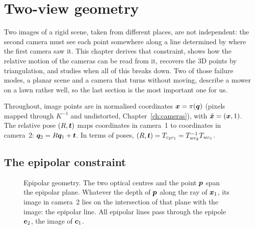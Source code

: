 \chapter{Two-view geometry}
\label{ch:twoview}

Two images of a rigid scene, taken from different places, are not
independent: the second camera must see each point somewhere along a
line determined by where the first camera saw it. This chapter derives
that constraint, shows how the relative motion of the cameras can be
read from it, recovers the 3D points by triangulation, and studies when
all of this breaks down. Two of those failure modes, a planar scene and
a camera that turns without moving, describe a mower on a lawn rather
well, so the last section is the most important one for us.

Throughout, image points are in normalised coordinates
$\bm{x}=\pi(\bm{q})$ (pixels mapped through $K^{-1}$ and
undistorted, Chapter~\ref{ch:cameras}), with $\tilde{\bm{x}}=
(\bm{x},1)$. The relative pose $(R,\bm{t})$ maps coordinates in
camera~1 to coordinates in camera~2: $\bm{q}_2=R\bm{q}_1+\bm{t}$.
In terms of poses, $(R,\bm{t})=T_{c_2c_1}=T_{wc_2}^{-1}T_{wc_1}$.

\section{The epipolar constraint}

\begin{figure}[ht]
\centering
{}
\caption{Epipolar geometry. The two optical centres and the point $\bm{p}$
span the epipolar plane. Whatever the depth of $\bm{p}$ along the ray of
$\bm{x}_1$, its image in camera~2 lies on the intersection of that
plane with the image: the epipolar line. All epipolar lines pass
through the epipole $\bm{e}_2$, the image of $\bm{c}_1$.}
\label{fig:epipolar}
\end{figure}

